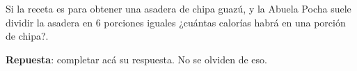 \documentclass[10pt]{examdesign}
\theoremstyle{plain}
\theoremstyle{definition}
\theoremstyle{remark}
\begin{document}
\begin{shortanswer}[title={\textit{Receta que le dijo la Abuela Pocha a Ana y
    			Juan.}},
    	rearrange=no,resetcounter=no]
        \begin{question}
        	Si la receta es para obtener una asadera de chipa guazú, y la Abuela Pocha suele dividir
        	la asadera en 6 porciones iguales ¿cuántas calorías habrá en una porción de chipa?.
        	\begin{answer}
        		\textbf{Repuesta}: completar acá su respuesta. No se olviden de eso.
        	\end{answer}
        \end{question}
    \end{shortanswer}
\end{document}
